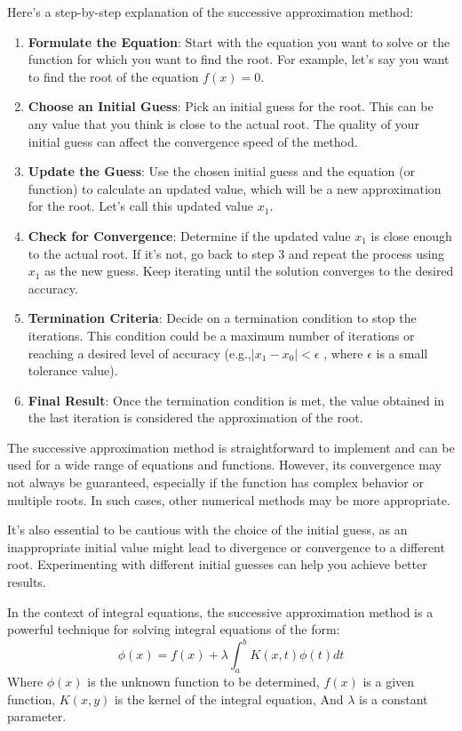 \documentclass[]{article}
\begin{document}
Here's a step-by-step explanation of the successive approximation method:

\begin{enumerate}[itemsep=10pt]
    \item \textbf{Formulate the Equation}: Start with the equation you want to solve or the function for which you want to find the root. For example, let's say you want to find the root of the equation $f(x)=0$.
    \item \textbf{Choose an Initial Guess}: Pick an initial guess for the root. This can be any value that you think is close to the actual root. The quality of your initial guess can affect the convergence speed of the method.
    \item \textbf{Update the Guess}: Use the chosen initial guess and the equation (or function) to calculate an updated value, which will be a new approximation for the root. Let's call this updated value $x_1$.
    \item \textbf{Check for Convergence}: Determine if the updated value $x_1$ is close enough to the actual root. If it's not, go back to step 3 and repeat the process using $x_1$ as the new guess. Keep iterating until the solution converges to the desired accuracy.
    \item \textbf{Termination Criteria}: Decide on a termination condition to stop the iterations. This condition could be a maximum number of iterations or reaching a desired level of accuracy (e.g.,$|x_1-x_0|<\epsilon$ , where $\epsilon$ is a small tolerance value).
    \item \textbf{Final Result}: Once the termination condition is met, the value obtained in the last iteration is considered the approximation of the root.
\end{enumerate}
The successive approximation method is straightforward to implement and can be used for a wide range of equations and functions. However, its convergence may not always be guaranteed, especially if the function has complex behavior or multiple roots. In such cases, other numerical methods may be more appropriate.

It's also essential to be cautious with the choice of the initial guess, as an inappropriate initial value might lead to divergence or convergence to a different root. Experimenting with different initial guesses can help you achieve better results.

In the context of integral equations, the successive approximation method is a powerful technique for solving integral equations of the form:
\[
\phi(x) = f(x) + \lambda\int_{a}^{b} K(x,t) \phi(t)dt    
\]
Where $\phi(x)$ is the unknown function to be determined,
$f(x)$  is a given function, $K(x,y)$ is the kernel of the integral equation,
And $\lambda$ is a constant parameter.
\end{document}
